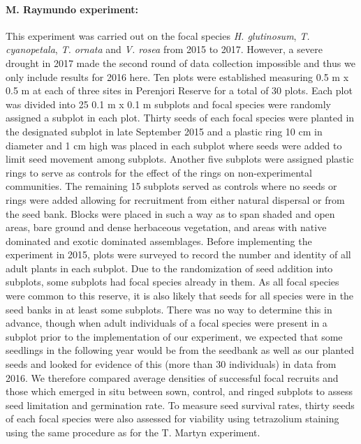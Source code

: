 \documentclass[a4,12pt]{article}
\begin{document}
        \paragraph{M. Raymundo experiment:}
        This experiment was carried out on the focal species \textit{H. glutinosum}, \textit{T. cyanopetala}, \textit{T. ornata} and \textit{V. rosea} from 2015 to 2017. However, a severe drought in 2017 made the second round of data collection impossible and thus we only include results for 2016 here. Ten plots were established measuring 0.5 m x 0.5 m at each of three sites in Perenjori Reserve for a total of 30 plots. Each plot was divided into 25 0.1 m x 0.1 m subplots and focal species were randomly assigned a subplot in each plot. Thirty seeds of each focal species were planted in the designated subplot in late September 2015 and a plastic ring 10 cm in diameter and 1 cm high was placed in each subplot where seeds were added to limit seed movement among subplots. Another five subplots were assigned plastic rings to serve as controls for the effect of the rings on non-experimental communities. The remaining 15 subplots served as controls where no seeds or rings were added allowing for recruitment from either natural dispersal or from the seed bank. Blocks were placed in such a way as to span shaded and open areas, bare ground and dense herbaceous vegetation, and areas with native dominated and exotic dominated assemblages. Before implementing the experiment in 2015, plots were surveyed to record the number and identity of all adult plants in each subplot. Due to the randomization of seed addition into subplots, some subplots had focal species already in them. As all focal species were common to this reserve, it is also likely that seeds for all species were in the seed banks in at least some subplots. There was no way to determine this in advance, though when adult individuals of a focal species were present in a subplot prior to the implementation of our experiment, we expected that some seedlings in the following year would be from the seedbank as well as our planted seeds and looked for evidence of this (more than 30 individuals) in data from 2016. We therefore compared average densities of successful focal recruits and those which emerged in situ between sown, control, and ringed subplots to assess seed limitation and germination rate. To measure seed survival rates, thirty seeds of each focal species were also assessed for viability using tetrazolium staining using the same procedure as for the T. Martyn experiment. 
\end{document}
